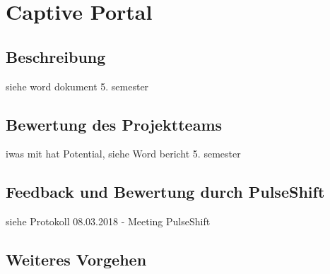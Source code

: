 \section{Captive Portal}


\subsection{Beschreibung}

siehe word dokument 5. semester

\subsection{Bewertung des Projektteams}

iwas mit hat Potential, siehe Word bericht 5. semester

\subsection{Feedback und Bewertung durch PulseShift}

siehe Protokoll 08.03.2018 - Meeting PulseShift

\subsection{Weiteres Vorgehen}
